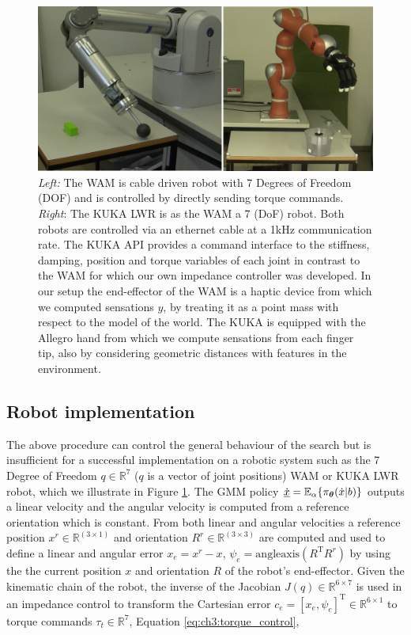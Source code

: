 \begin{figure}
 \centering
 \includegraphics[width=\textwidth]{./ch3-Search/Figures/robots}
 \caption{\textit{Left:} The WAM is cable driven robot with 7 Degrees of Freedom (DOF) and is controlled by directly sending torque commands. 
 \textit{Right}: The KUKA LWR is as the WAM a 7 (DoF) robot. Both robots are controlled via an ethernet cable at a 1kHz communication rate. The KUKA API 
 provides a command interface to the stiffness, damping, position and torque variables of each joint in contrast to the WAM for which our own impedance 
 controller was developed. In our setup the end-effector of the WAM is a haptic device from which we computed sensations $y$, by treating it as a point mass with respect
 to the model of the world. The KUKA is equipped with the Allegro hand from which we compute sensations from each finger tip, also by considering geometric distances 
 with features in the environment.}
 \label{fig:ch3:wam:kuka}
\end{figure}

\subsection{Robot implementation}

The above procedure can control the general behaviour of the search but is insufficient for a successful implementation on a robotic system 
such as the 7 Degree of Freedom $q\in\mathbb{R}^7$ ($q$ is a vector of joint positions) WAM or KUKA LWR robot, which we illustrate in Figure \ref{fig:ch3:wam:kuka}. 
The GMM policy $\underline{\dot{x}} = \mathbb{E}_{\alpha}\{\pi_{\boldsymbol{\theta}}(\dot{x}|b)\}$ outputs a linear velocity and the 
angular velocity is computed from a reference orientation which is constant. 
From both linear and angular velocities a reference position $x^r \in \mathbb{R}^{(3 \times 1)}$ and orientation $R^r \in \mathbb{R}^{(3 \times 3)}$ are computed and used to 
define a linear and angular error $x_e = x^r - x$, $\psi_e = \mathrm{angleaxis}(R^{\mathrm{T}}R^r)$ by using the  
the current position $x$ and orientation $R$ of the robot's end-effector.
Given the kinematic chain of the robot, the inverse of the Jacobian $J(q) \in \mathbb{R}^{6\times 7}$ is used in an impedance control to transform the 
Cartesian error $c_e = [x_e,\psi_e]^{\mathrm{T}} \in \mathbb{R}^{6 \times 1}$ to torque commands $\tau_t \in \mathbb{R}^7$, Equation \ref{eq:ch3:torque_control},

